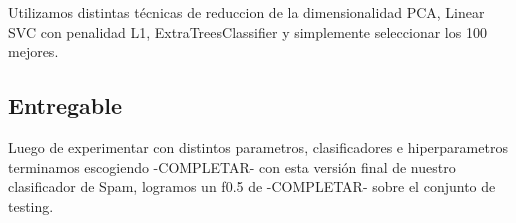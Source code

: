 
Utilizamos distintas técnicas de reduccion de la dimensionalidad PCA, Linear SVC con penalidad L1, ExtraTreesClassifier y simplemente seleccionar los 100 mejores.


\subsection{Entregable}

Luego de experimentar con distintos parametros, clasificadores e hiperparametros terminamos escogiendo -COMPLETAR- con esta versión final de nuestro clasificador de Spam, logramos un f0.5 de -COMPLETAR- sobre el conjunto de testing. 